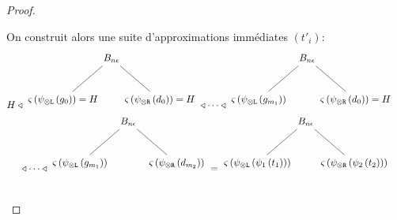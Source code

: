\documentclass[11pt,a4paper]{article}
\theoremstyle{plain}
\theoremstyle{definition}
\theoremstyle{remark}
\newcommand*{\tensor}{\otimes}
\newcommand*{\someperm}{\varsigma}
\newcommand*{\Left}{\textnormal{\texttt{L}}}
\newcommand*{\Right}{\textnormal{\texttt{R}}}
\newcommand*{\relapprox}{\ensuremath{\triangleleft}}
\newcommand*{\unknown}{H}
\begin{document}
\begin{proof}
\begin{description}
            On construit alors une suite d'approximations immédiates $(t'_i):$
            \begin{align*}
                \begin{multlined}
                    \unknown
                    \relapprox
                    \begin{tikzpicture}%
                    [level 1/.style={sibling distance=3.5cm}]
                    \node {$B_{n \epsilon}$}
                        child {node {$\someperm \left( \psi_{\tensor\Left} \left(
                        g_0\right) \right) = \unknown$}}
                        child {node {$\someperm \left( \psi_{\tensor\Right} \left(
                        d_0\right) \right) = \unknown$}
                    };
                    \end{tikzpicture}
                    \relapprox \cdots \relapprox
                    \begin{tikzpicture}%
                    [level 1/.style={sibling distance=3.5cm}]
                    \node {$B_{n \epsilon}$}
                        child {node {$\someperm \left( \psi_{\tensor\Left} \left(
                        g_{m_1}\right) \right)$}}
                        child {node {$\someperm \left( \psi_{\tensor\Right} \left(
                        d_0\right) \right) = \unknown$}
                    };
                    \end{tikzpicture}\\
                    \relapprox \cdots \relapprox
                    \begin{tikzpicture}%
                    [level 1/.style={sibling distance=3.5cm}]
                    \node {$B_{n \epsilon}$}
                        child {node {$\someperm \left( \psi_{\tensor\Left} \left(
                        g_{m_1}\right) \right)$}}
                        child {node {$\someperm \left( \psi_{\tensor\Right} \left(
                        d_{m_2}\right) \right)$}
                    };
                    \end{tikzpicture}
                    =
                    \begin{tikzpicture}%
                    [level 1/.style={sibling distance=3.5cm}]
                    \node {$B_{n \epsilon}$}
                        child {node {$\someperm \left( \psi_{\tensor\Left} \left( \psi_1 \left(
                            t_1
                          \right) \right) \right)$}}
                        child {node {$\someperm \left( \psi_{\tensor\Right} \left( \psi_2 \left(
                            t_2
                          \right) \right) \right)$}
                    };
                    \end{tikzpicture}\\
                \end{multlined}
            \end{align*}
    

\end{description}
\end{proof}
\end{document}
